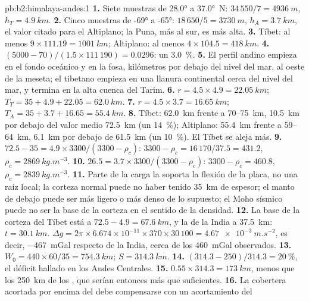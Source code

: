 \begin{solution}{pb:b2:himalaya-andes:1}
\textbf{1.} Siete muestras de \ang{28.0} a \ang{37.0}~N: $34\,550/7 = \qty{4936}{m}$, $h_T
= \qty{4.9}{km}$.
\textbf{2.} Cinco muestras de \ang{-69} a \ang{-65}: $18\,650/5 = \qty{3730}{m}$, $h_A =
\qty{3.7}{km}$, el valor citado para el Altiplano; la Puna, más al sur, es más alta.
\textbf{3.} Tíbet: al menos $9\times111.19 = \qty{1001}{km}$; Altiplano: al menos $4\times
104.5 = \qty{418}{km}$.
\textbf{4.} $(5000 - 70)/(1.5\times111\,190) = 0.0296$: un \qty{3.0}{\percent}.
\textbf{5.} El perfil andino empieza en el fondo oceánico y en la fosa, kilómetros por debajo
del nivel del mar, al oeste de la meseta; el tibetano empieza en una llanura continental cerca del nivel del mar,
y termina en la alta cuenca del Tarim.
\textbf{6.} $r = 4.5\times4.9 = \qty{22.05}{km}$; $T_T = 35 + 4.9 + 22.05 = \qty{62.0}{km}$.
\textbf{7.} $r = 4.5\times3.7 = \qty{16.65}{km}$; $T_A = 35 + 3.7 + 16.65 = \qty{55.4}{km}$.
\textbf{8.} Tíbet: \qty{62.0}{km} frente a 70--\qty{75}{km}, \qty{10.5}{km} por debajo del valor
medio \qty{72.5}{km} (un \qty{14}{\percent}); Altiplano: \qty{55.4}{km} frente a 59--\qty{64}{km},
\qty{6.1}{km} por debajo de \qty{61.5}{km} (un \qty{10}{\percent}). El Tíbet se aleja más.
\textbf{9.} $72.5 - 35 = 4.9\times3300/(3300 - \rho_c)$: $3300 - \rho_c = 16\,170/37.5 =
431.2$, $\rho_c = \qty{2869}{kg.m^{-3}}$.
\textbf{10.} $26.5 = 3.7\times3300/(3300 - \rho_c)$: $3300 - \rho_c = 460.8$, $\rho_c =
\qty{2839}{kg.m^{-3}}$.
\textbf{11.} Parte de la carga la soporta la flexión de la placa, no una raíz local; la
corteza normal puede no haber tenido \qty{35}{km} de espesor; el manto de debajo puede ser más ligero o más denso
de lo supuesto; el Moho sísmico puede no ser la base de la corteza en el sentido de la densidad.
\textbf{12.} La base de la corteza del Tíbet está a $72.5 - 4.9 = \qty{67.6}{km}$, y la de la India a
\qty{37.5}{km}: $t = \qty{30.1}{km}$. $\Delta g = 2\pi\times6.674\times10^{-11}\times370\times
30\,100 = \qty{4.67e-3}{m.s^{-2}}$, es decir, \qty{-467}{mGal} respecto de la India, cerca de los
\qty{460}{mGal} observados.
\textbf{13.} $W_0 = 440\times60/35 = \qty{754.3}{km}$; $S = \qty{314.3}{km}$.
\textbf{14.} $(314.3 - 250)/314.3 = \qty{20}{\percent}$, el déficit hallado en los Andes
Centrales.
\textbf{15.} $0.55\times314.3 = \qty{173}{km}$, menos que los \qty{250}{km} de los , que serían entonces más que suficientes.
\textbf{16.} La cobertera acortada por encima del  debe compensarse con un acortamiento del

\end{solution}
